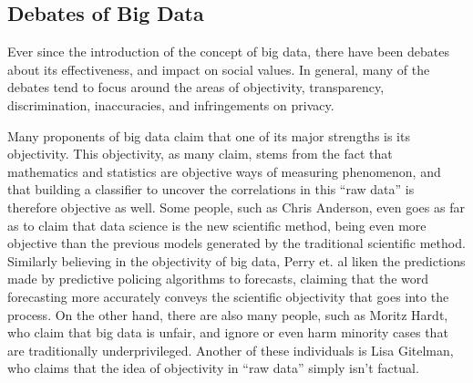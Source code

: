 \documentclass[12pt]{article} %
\begin{document}
\subsection{Debates of Big Data}
Ever since the introduction of the concept of big data, there have been debates about its effectiveness, and impact on social values. In general, many of the debates tend to focus around the areas of objectivity, transparency, discrimination, inaccuracies, and infringements on privacy.

Many proponents of big data claim that one of its major strengths is its objectivity. This objectivity, as many claim, stems from the fact that mathematics and statistics are objective ways of measuring phenomenon, and that building a classifier to uncover the correlations in this ``raw data'' is therefore objective as well. Some people, such as Chris Anderson, even goes as far as to claim that data science is the new scientific method, being even more objective than the previous models generated by the traditional scientific method. \cite{anderson_2008} Similarly believing in the objectivity of big data, Perry et. al liken the predictions made by predictive policing algorithms to forecasts, claiming that the word forecasting more accurately conveys the scientific objectivity that goes into the process. \cite{perryetal} On the other hand, there are also many people, such as Moritz Hardt, who claim that big data is unfair, and ignore or even harm minority cases that are traditionally underprivileged. \cite{hardt} Another of these individuals is Lisa Gitelman, who claims that the idea of objectivity in ``raw data'' simply isn't factual. \cite{gitelman2013raw}
\end{document}
